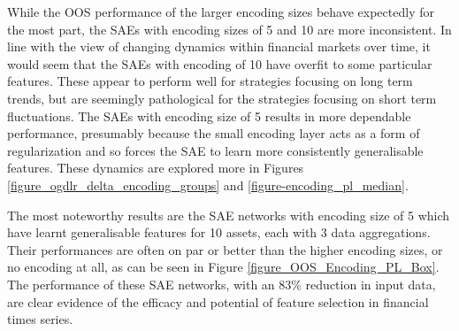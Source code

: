 \documentclass[a4paper,11pt,oneside]{article}
\theoremstyle{plain}
\theoremstyle{definition}
\begin{document}
	While the OOS performance of the larger encoding sizes behave expectedly for the most part, the SAEs with encoding sizes of 5 and 10 are more inconsistent. In line with the view of changing dynamics within financial markets over time, it would seem that the SAEs with encoding of 10 have overfit to some particular features. These appear to perform well for strategies focusing on long term trends, but are seemingly pathological for the strategies focusing on short term fluctuations. The SAEs with encoding size of 5 results in more dependable performance, presumably because the small encoding layer acts as a form of regularization and so forces the SAE to learn more consistently generalisable features. These dynamics are explored more in Figures \ref{figure_ogdlr_delta_encoding_groups} and \ref{figure-encoding_pl_median}.  \newline
	
	The most noteworthy results are the SAE networks with encoding size of 5  which have learnt generalisable features for 10 assets, each with 3 data aggregations. Their performances are often on par or better than the higher encoding sizes, or no encoding at all, as can be seen in Figure \ref{figure_OOS_Encoding_PL_Box}. The performance of these SAE networks, with an 83\% reduction in input data, are clear evidence of the efficacy and potential of feature selection in financial times series.\newline
	
\end{document}
